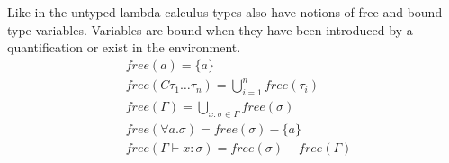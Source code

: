 \documentclass[11pt,oneside,a4paper]{report}
\begin{document}
Like in the untyped lambda calculus types also have notions of free and bound type variables.
Variables are bound when they have been introduced by a quantification or exist in the environment.
\begin{align}
	 & \textit{free}(a) = \{ a \}                                                              \\
	 & \textit{free}(C \tau_1 \dots \tau_n ) = \bigcup_{i = 1}^n \textit{free}(\tau_i)           \\
	 & \textit{free}(\Gamma) = \bigcup_{x:\sigma \in \Gamma} \textit{free}(\sigma)             \\
	 & \textit{free}(\forall a . \sigma) = \textit{free}(\sigma) - \{ a \}                     \\
	 & \textit{free}(\Gamma \vdash x : \sigma) = \textit{free}(\sigma) - \textit{free}(\Gamma)
\end{align}
\end{document}
